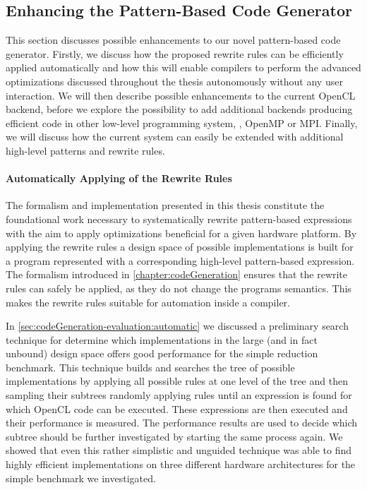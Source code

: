 \subsection{Enhancing the Pattern-Based Code Generator}
\label{section:future-work:codeGenerator}

This section discusses possible enhancements to our novel pattern-based code generator.
Firstly, we discuss how the proposed rewrite rules can be efficiently applied automatically and how this will enable compilers to perform the advanced optimizations discussed throughout the thesis autonomously without any user interaction.
We will then describe possible enhancements to the current OpenCL backend, before we explore the possibility to add additional backends producing efficient code in other low-level programming system, \eg, OpenMP or MPI.
Finally, we will discuss how the current system can easily be extended with additional high-level patterns and rewrite rules.

\paragraph{Automatically Applying of the Rewrite Rules}
The formalism and implementation presented in this thesis constitute the foundational work necessary to systematically rewrite pattern-based expressions with the aim to apply optimizations beneficial for a given hardware platform.
By applying the rewrite rules a design space of possible implementations is built for a program represented with a corresponding high-level pattern-based expression.
The formalism introduced in \autoref{chapter:codeGeneration} ensures that the rewrite rules can safely be applied, as they do not change the programs semantics.
This makes the rewrite rules suitable for automation inside a compiler.

In \autoref{sec:codeGeneration-evaluation:automatic} we discussed a preliminary search technique for determine which implementations in the large (and in fact unbound) design space offers good performance for the simple reduction benchmark.
This technique builds and searches the tree of possible implementations by applying all possible rules at one level of the tree and then sampling their subtrees randomly applying rules until an expression is found for which OpenCL code can be executed.
These expressions are then executed and their performance is measured.
The performance results are used to decide which subtree should be further investigated by starting the same process again.
We showed that even this rather simplistic and unguided technique was able to find highly efficient implementations on three different hardware architectures for the simple benchmark we investigated.

